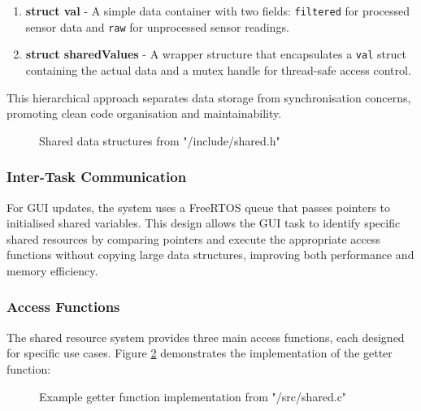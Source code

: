 \documentclass[a4paper, 11pt, titlepage]{article}
\begin{document}
\begin{enumerate}
    \item \textbf{struct val} - A simple data container with two fields: \verb|filtered| for processed sensor data and \verb|raw| for unprocessed sensor readings.
    \item \textbf{struct sharedValues} - A wrapper structure that encapsulates a \verb|val| struct containing the actual data and a mutex handle for thread-safe access control.
\end{enumerate}

This hierarchical approach separates data storage from synchronisation concerns, promoting clean code organisation and maintainability.

\begin{figure}[h!]
\centering
\begin{minipage}{0.5\linewidth}

\end{minipage}
\caption{Shared data structures from "/include/shared.h"}
\label{fig:shared_structs}
\end{figure}

\subsubsection{Inter-Task Communication}
For GUI updates, the system uses a FreeRTOS queue that passes pointers to initialised shared variables. This design allows the GUI task to identify specific shared resources by comparing pointers and execute the appropriate access functions without copying large data structures, improving both performance and memory efficiency.

\subsubsection{Access Functions}
The shared resource system provides three main access functions, each designed for specific use cases. Figure \ref{fig:getter_example} demonstrates the implementation of the getter function:

\begin{figure}[h!]
\centering
\begin{minipage}{0.8\linewidth}

\end{minipage}
\caption{Example getter function implementation from "/src/shared.c"}
\label{fig:getter_example}
\end{figure}
\end{document}
